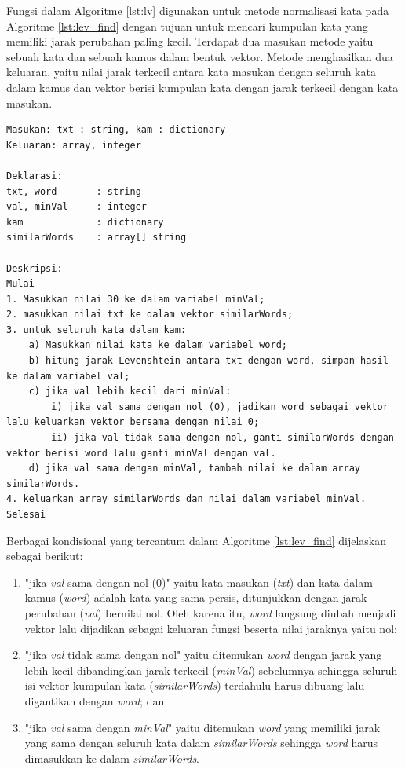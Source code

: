 Fungsi dalam Algoritme \ref{lst:lv} digunakan untuk metode normalisasi kata pada Algoritme \ref{lst:lev_find} dengan tujuan untuk mencari kumpulan kata yang memiliki jarak perubahan paling kecil. Terdapat dua masukan metode yaitu sebuah kata dan sebuah kamus dalam bentuk vektor. Metode menghasilkan dua keluaran, yaitu nilai jarak terkecil antara kata masukan dengan seluruh kata dalam kamus dan vektor berisi kumpulan kata dengan jarak terkecil dengan kata masukan.
\begin{lstlisting}[caption={Algoritme Fungsi Normalisasi Kata dengan Jarak Levenshtein},label={lst:lev_find},float=ht]
Masukan: txt : string, kam : dictionary
Keluaran: array, integer

Deklarasi:
txt, word		: string
val, minVal 	: integer
kam				: dictionary
similarWords	: array[] string

Deskripsi:
Mulai
1. Masukkan nilai 30 ke dalam variabel minVal;
2. masukkan nilai txt ke dalam vektor similarWords;
3. untuk seluruh kata dalam kam:
	a) Masukkan nilai kata ke dalam variabel word;
	b) hitung jarak Levenshtein antara txt dengan word, simpan hasil ke dalam variabel val;
	c) jika val lebih kecil dari minVal:
		i) jika val sama dengan nol (0), jadikan word sebagai vektor lalu keluarkan vektor bersama dengan nilai 0;
		ii) jika val tidak sama dengan nol, ganti similarWords dengan vektor berisi word lalu ganti minVal dengan val.
	d) jika val sama dengan minVal, tambah nilai ke dalam array similarWords.
4. keluarkan array similarWords dan nilai dalam variabel minVal.
Selesai
\end{lstlisting}

Berbagai kondisional yang tercantum dalam Algoritme \ref{lst:lev_find} dijelaskan sebagai berikut:
\begin{enumerate}
	\item "jika \textit{val} sama dengan nol (0)" yaitu kata masukan (\textit{txt}) dan kata dalam kamus (\textit{word}) adalah kata yang sama persis, ditunjukkan dengan jarak perubahan (\textit{val}) bernilai nol. Oleh karena itu, \textit{word} langsung diubah menjadi vektor lalu dijadikan sebagai keluaran fungsi beserta nilai jaraknya yaitu nol;
	\item "jika \textit{val} tidak sama dengan nol" yaitu ditemukan \textit{word} dengan jarak yang lebih kecil dibandingkan jarak terkecil (\textit{minVal}) sebelumnya sehingga seluruh isi vektor kumpulan kata (\textit{similarWords}) terdahulu harus dibuang lalu digantikan dengan \textit{word}; dan
	\item "jika \textit{val} sama dengan \textit{minVal}" yaitu ditemukan \textit{word} yang memiliki jarak yang sama dengan seluruh kata dalam \textit{similarWords} sehingga \textit{word} harus dimasukkan ke dalam \textit{similarWords}.
\end{enumerate}

